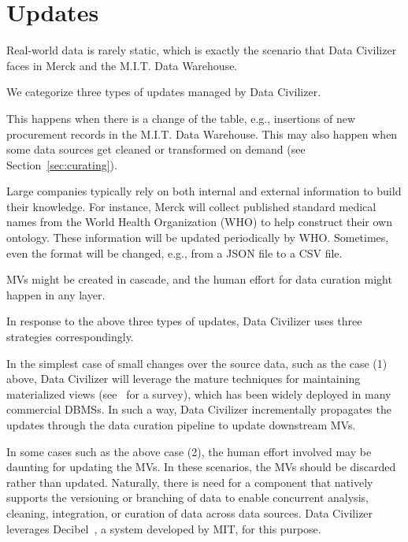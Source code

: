 \section{Updates}
\label{sec:updates}

Real-world data is rarely static, which is exactly the scenario that Data Civilizer faces in Merck and the M.I.T. Data Warehouse.

We categorize three types of updates managed by Data Civilizer.

This happens when there is a change of the table, e.g., insertions of new procurement records in the M.I.T. Data Warehouse. This may also happen when some data sources get cleaned or transformed on demand (see Section~\ref{sec:curating}).

Large companies typically rely on both internal and external information to build their knowledge. For instance, Merck will collect published standard medical names from the World Health Organization (WHO) to help construct their own ontology. These information will be updated periodically by WHO. Sometimes, even the format will be changed, e.g., from a JSON file to a CSV file.

MVs might be created in cascade, and the human effort for data curation might happen in any layer. 

In response to the above three types of updates, Data Civilizer uses three strategies correspondingly.

In the simplest case of small changes over the source data, such as the case (1) above, Data Civilizer will leverage the mature techniques for maintaining materialized views (see~\cite{DBLP:journals/debu/GuptaM95} for a survey), which has been widely deployed in many commercial DBMSs. In such a way, Data Civilizer incrementally propagates the updates through the data curation pipeline to update downstream MVs.  

In some cases such as the above case (2), the human effort involved may be daunting for updating the MVs. In these scenarios, the MVs should be discarded rather than updated. Naturally, there is need for a component that natively supports the versioning or branching of data to enable concurrent analysis, cleaning, integration, or curation of data across data sources. 
%
Data Civilizer leverages Decibel~\cite{DBLP:journals/pvldb/MaddoxGEMPD16}, a system developed by MIT, for this purpose.

